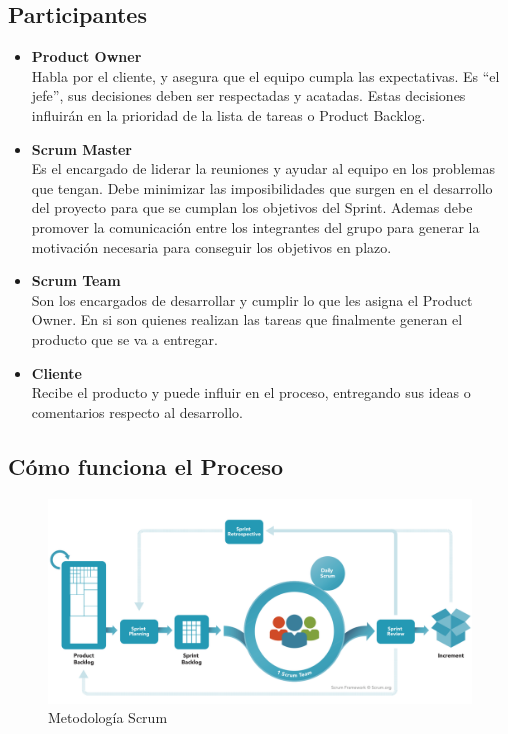 \subsection{Participantes}
\begin{itemize}
\item \textbf{Product Owner}\\
Habla por el cliente, y asegura que el equipo cumpla las expectativas. Es “el jefe”, sus decisiones deben ser
respectadas y acatadas. Estas  decisiones influirán en la prioridad de la lista de tareas o Product Backlog.



\item \textbf{Scrum Master}\\
Es el encargado de liderar la reuniones y ayudar al equipo en los problemas que tengan. Debe minimizar las imposibilidades que surgen en el desarrollo del proyecto para que se cumplan los objetivos del Sprint. Ademas debe promover la comunicación entre los integrantes del grupo para generar la motivación necesaria para conseguir los objetivos en plazo.




\item  \textbf{Scrum Team}\\
Son los encargados de desarrollar y cumplir lo que les asigna el Product Owner. En si son quienes realizan las tareas que finalmente generan el producto que se va a entregar.


\item  \textbf{Cliente}\\
Recibe el producto y puede influir en el proceso, entregando sus ideas o comentarios respecto al desarrollo.
\end{itemize}

\subsection{Cómo funciona el Proceso}



\begin{figure}[H]
		\centering
		\includegraphics[width=\textwidth] {scrum.jpg}
		\caption{Metodología Scrum }
		\label{fig:scrum}
	\end{figure} 


